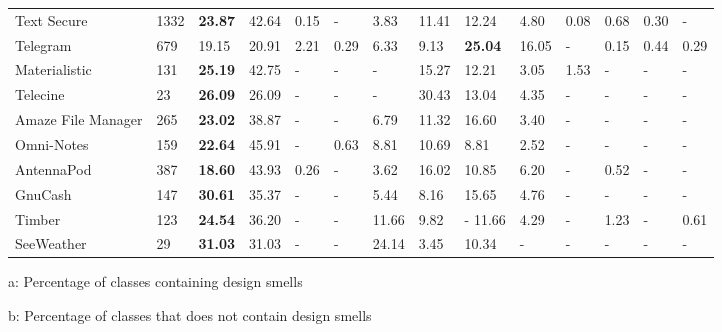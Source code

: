 \documentclass[AMA,Times1COL]{WileyNJDv5} %
\begin{document}
\begin{table}[h]
\begin{tabular*}{\textwidth}{@{\extracolsep\fill}llllllllllllll@{}}
		Text Secure & 1332 & \textbf{23.87}       & 42.64      & 0.15	 & - & 3.83                        & 11.41  & 12.24            & 4.80  & 0.08       & 0.68       & 0.30	       & -       \\
		Telegram & 679  & 19.15       & 20.91      & 2.21	 & 0.29 & 6.33                        & 9.13  &\textbf{25.04}            & 16.05  & -       & 0.15       & 0.44	       & 0.29 \\
		Materialistic& 131 & \textbf{25.19} & 42.75 & -	 & - & - & 15.27 & 12.21 & 3.05 & 1.53  & - & - & - \\
		Telecine & 23  &  \textbf{26.09} & 26.09 & - & - & -                        & 30.43  & 13.04  & 4.35  & - & - & -	& - \\
		Amaze File Manager & 265   & \textbf{23.02} & 38.87 & -	 & - & 6.79	& 11.32 & 16.60 & 3.40 & -       & -       & -	       & -      \\
		Omni-Notes & 159  & \textbf{22.64}	& 45.91  & -	 & 0.63 & 8.81 & 10.69 & 8.81 & 2.52 & -       & -       & -	       & -      \\
		AntennaPod  & 387  & \textbf{18.60}  & 43.93 & 0.26 & - & 3.62 & 16.02  & 10.85 & 6.20 & -  & 0.52 & -	 & - \\ 
		GnuCash & 147  &  \textbf{30.61} & 35.37   & - & - & 5.44 & 8.16 & 15.65 & 4.76 & -  & - & -  & -  \\
		Timber  & 123  & \textbf{24.54} & 36.20 & -	 & - & 11.66 & 9.82 & -          11.66  & 4.29  & -       & 1.23      & -	       & 0.61      \\
		SeeWeather & 29  & \textbf{31.03}	& 31.03  & -	 & - & 24.14 & 3.45 & 10.34 & -  & -       & -       & -	       & -      \\
		\bottomrule
	\end{tabular*}
	\begin{tablenotes}%
		\item[a: ] Percentage of classes containing design smells
		\item[b: ] Percentage of classes that does not contain design smells
	\end{tablenotes}
\end{table}
\end{document}
